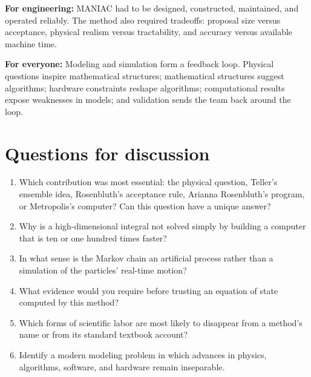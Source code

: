 \documentclass[11pt]{article}
\begin{document}
\textbf{For engineering:} MANIAC had to be designed, constructed, maintained,
and operated reliably. The method also required tradeoffs: proposal size versus
acceptance, physical realism versus tractability, and accuracy versus available
machine time.

\textbf{For everyone:} Modeling and simulation form a feedback loop. Physical
questions inspire mathematical structures; mathematical structures suggest
algorithms; hardware constraints reshape algorithms; computational results
expose weaknesses in models; and validation sends the team back around the loop.

\section{Questions for discussion}

\begin{enumerate}
  \item Which contribution was most essential: the physical question, Teller's
        ensemble idea, Rosenbluth's acceptance rule, Arianna Rosenbluth's
        program, or Metropolis's computer? Can this question have a unique answer?
  \item Why is a high-dimensional integral not solved simply by building a
        computer that is ten or one hundred times faster?
  \item In what sense is the Markov chain an artificial process rather than a
        simulation of the particles' real-time motion?
  \item What evidence would you require before trusting an equation of state
        computed by this method?
  \item Which forms of scientific labor are most likely to disappear from a
        method's name or from its standard textbook account?
  \item Identify a modern modeling problem in which advances in physics,
        algorithms, software, and hardware remain inseparable.
\end{enumerate}
\end{document}
